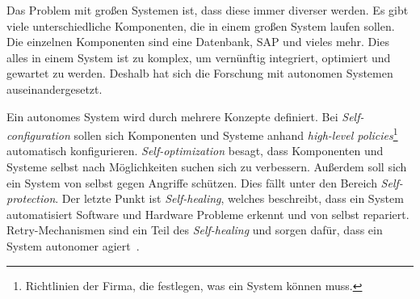
Das Problem mit großen Systemen ist, dass diese immer diverser werden.
Es gibt viele unterschiedliche Komponenten, die in einem großen System laufen sollen.
Die einzelnen Komponenten sind eine Datenbank, SAP und vieles mehr.
Dies alles in einem System ist zu komplex, um vernünftig integriert, optimiert und gewartet zu werden.
Deshalb hat sich die Forschung mit autonomen Systemen auseinandergesetzt.

Ein autonomes System wird durch mehrere Konzepte definiert.
Bei \emph{Self-configuration} sollen sich Komponenten und Systeme anhand \emph{high-level policies}\footnote{Richtlinien
 der Firma, die festlegen, was ein System können muss.} automatisch konfigurieren.
\emph{Self-optimization} besagt, dass Komponenten und Systeme selbst nach Möglichkeiten suchen sich zu verbessern.
Außerdem soll sich ein System von selbst gegen Angriffe schützen.
Dies fällt unter den Bereich \emph{Self-protection}.
Der letzte Punkt ist \emph{Self-healing}, welches beschreibt, dass ein System automatisiert Software und Hardware
Probleme erkennt und von selbst repariert.
Retry-Mechanismen sind ein Teil des \emph{Self-healing} und sorgen dafür, dass ein System autonomer agiert~\cite{Kephart2003}.
